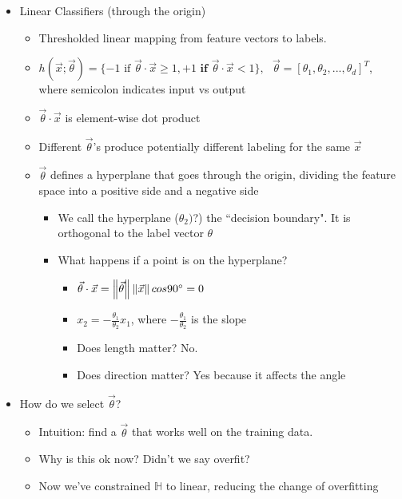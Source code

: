 \documentclass[10pt, oneside]{article}
\newcommand{\norm}[1]{\left\lVert#1\right\rVert}
\begin{document}
\begin{itemize}
\begin{itemize}
    \end{itemize}
    \item Linear Classifiers (through the origin)
    \begin{itemize}
        \item Thresholded linear mapping from feature vectors to labels.
        \item $h(\vec{x}; \vec{\theta}) = \{-1 \text{ if } \vec{\theta} \cdot \vec{x} \geq 1, +1 \textbf{ if } \vec{\theta}\cdot \vec{x} < 1\},\text{   } \vec{\theta} = [\theta_1,\theta_2, ..., \theta_d]^T$, where semicolon indicates input vs output
        \item $\vec{\theta} \cdot \vec{x}$ is element-wise dot product
        \item Different $\vec{\theta}$'s produce potentially different labeling for the same $\vec{x}$
        \item $\vec{\theta}$ defines a hyperplane that goes through the origin, dividing the feature space into a positive side and a negative side
        \begin{itemize}
            \item We call the hyperplane ($\theta_2)$?) the ``decision boundary". It is orthogonal to the label vector $\theta$
            \item What happens if a point is on the hyperplane?
            \begin{itemize}
                \item $\vec{\theta} \cdot \vec{x} = \norm{\vec{\theta}}\norm{\vec{x}}cos90\degree = 0$
                \item $x_2 = - \frac{\theta_1}{\theta_2}x_1$, where $-\frac{\theta_1}{\theta_2}$ is the slope
                \item Does length matter? No.
                \item Does direction matter? Yes because it affects the angle
            \end{itemize}
        \end{itemize}
    \end{itemize}
    \item How do we select $\vec{\theta}$?
    \begin{itemize}
        \item Intuition: find a $\vec{\theta}$ that works well on the training data.
        \item Why is this ok now? Didn't we say overfit?
        \item Now we've constrained $\mathbb{H}$ to linear, reducing the change of overfitting

\end{itemize}
\end{itemize}
\end{document}
